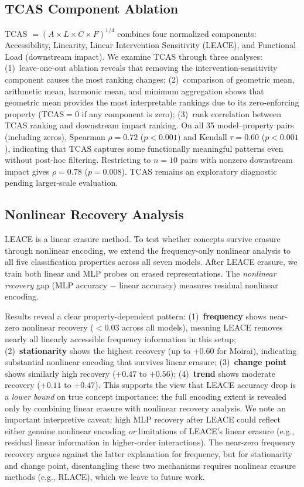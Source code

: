 \documentclass{article}
\begin{document}
\subsection{TCAS Component Ablation}
\label{sec:tcas_ablation}

TCAS $= (A \times L \times C \times F)^{1/4}$ combines four normalized components: Accessibility, Linearity, Linear Intervention Sensitivity (LEACE), and Functional Load (downstream impact). We examine TCAS through three analyses: (1)~leave-one-out ablation reveals that removing the intervention-sensitivity component causes the most ranking changes; (2)~comparison of geometric mean, arithmetic mean, harmonic mean, and minimum aggregation shows that geometric mean provides the most interpretable rankings due to its zero-enforcing property (TCAS$=0$ if any component is zero); (3)~rank correlation between TCAS ranking and downstream impact ranking. On all 35 model--property pairs (including zeros), Spearman $\rho = 0.72$ ($p < 0.001$) and Kendall $\tau = 0.60$ ($p < 0.001$), indicating that TCAS captures some functionally meaningful patterns even without post-hoc filtering. Restricting to $n = 10$ pairs with nonzero downstream impact gives $\rho = 0.78$ ($p = 0.008$). TCAS remains an exploratory diagnostic pending larger-scale evaluation.

\subsection{Nonlinear Recovery Analysis}
\label{sec:nonlinear_recovery}

LEACE is a linear erasure method. To test whether concepts survive erasure through nonlinear encoding, we extend the frequency-only nonlinear analysis to all five classification properties across all seven models. After LEACE erasure, we train both linear and MLP probes on erased representations. The \emph{nonlinear recovery} gap (MLP accuracy $-$ linear accuracy) measures residual nonlinear encoding.

Results reveal a clear property-dependent pattern: (1)~\textbf{frequency} shows near-zero nonlinear recovery ($<0.03$ across all models), meaning LEACE removes nearly all linearly accessible frequency information in this setup; (2)~\textbf{stationarity} shows the highest recovery (up to $+0.60$ for Moirai), indicating substantial nonlinear encoding that survives linear erasure; (3)~\textbf{change point} shows similarly high recovery ($+0.47$ to $+0.56$); (4)~\textbf{trend} shows moderate recovery ($+0.11$ to $+0.47$). This supports the view that LEACE accuracy drop is a \emph{lower bound} on true concept importance: the full encoding extent is revealed only by combining linear erasure with nonlinear recovery analysis. We note an important interpretive caveat: high MLP recovery after LEACE could reflect either genuine nonlinear encoding \emph{or} limitations of LEACE's linear erasure (e.g., residual linear information in higher-order interactions). The near-zero frequency recovery argues against the latter explanation for frequency, but for stationarity and change point, disentangling these two mechanisms requires nonlinear erasure methods (e.g., RLACE), which we leave to future work.
\end{document}
